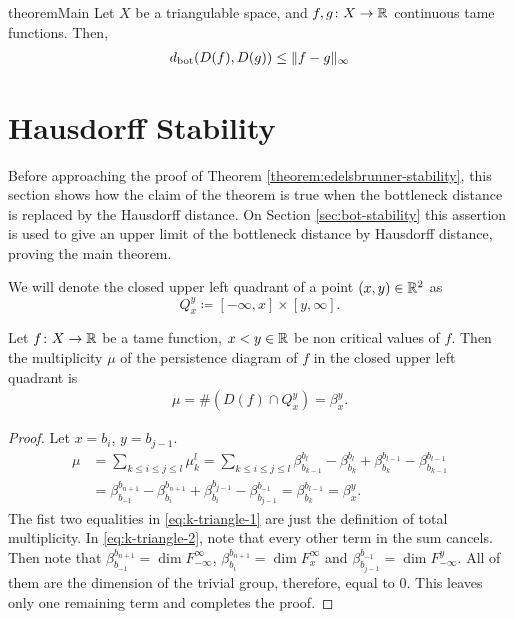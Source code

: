 \begin{restatable}{theorem}{Main} \label{theorem:edelsbrunner-stability}
    Let $ X $ be a triangulable space, and $ f, g\colon X \to \mathbb R $ continuous tame functions. Then,
    \begin{align}
        d_{\operatorname{bot}} (D(f), D(g)) \leq \|f-g\|_\infty
    \end{align}
\end{restatable}

\section{Hausdorff Stability}

Before approaching the proof of Theorem \ref{theorem:edelsbrunner-stability}, this section shows how the claim of the theorem is true when the bottleneck distance is replaced by the Hausdorff distance. On Section \ref{sec:bot-stability} this assertion is used to give an upper limit of the bottleneck distance by Hausdorff distance, proving the main theorem.

We will denote the closed upper left quadrant of a point $ (x, y) \in \mathbb R^2 $ as 
\begin{equation}
    Q_x^y \coloneq [-\infty, x] \times [y, \infty].
\end{equation}

\begin{lemma} \label{lemma:k-triangle}
    Let $ f\colon X \to \mathbb R $ be a tame function, $ x < y \in \mathbb R $ be non critical values of $ f $. Then the multiplicity $\mu $ of the persistence diagram of $ f $ in the closed upper left quadrant is 
    \begin{align}
        \mu = \# (D(f) \cap Q_x^y) = \beta_x^y.
    \end{align}
\end{lemma}
\begin{proof}
    Let $ x = b_i $, $ y = b_{j-1} $.
    \begin{align} 
        \mu &= \sum_{k \leq i \leq j \leq l} \mu_k^l = \sum_{k \leq i \leq j \leq l} \beta_{b_{k-1}}^{b_l} - \beta_{b_k}^{b_l} + \beta_{b_k}^{b_{l-1}} - \beta_{b_{k-1}}^{b_{l-1}} \label{eq:k-triangle-1} \\
        &= \beta_{b_{-1}}^{b_{n+1}} - \beta_{b_i}^{b_{n+1}} + \beta_{b_i}^{b_{j-1}} - \beta_{b_{j-1}}^{b_{-1}} = \beta_{b_k}^{b_{l-1}} = \beta_x^y. \label{eq:k-triangle-2}
    \end{align}
    The fist two equalities in \eqref{eq:k-triangle-1} are just the definition of total multiplicity. In \eqref{eq:k-triangle-2}, note that every other term in the sum cancels. Then note that $ \beta_{b_{-1}}^{b_{n+1}} = \dim F_{-\infty}^{\infty} $, $ \beta_{b_i}^{b_{n+1}} = \dim F_{x}^{\infty} $ and $ \beta_{b_{j-1}}^{b_{-1}} = \dim F_{-\infty}^y $. All of them are the dimension of the trivial group, therefore, equal to $ 0 $. This leaves only one remaining term and completes the proof.
\end{proof}

